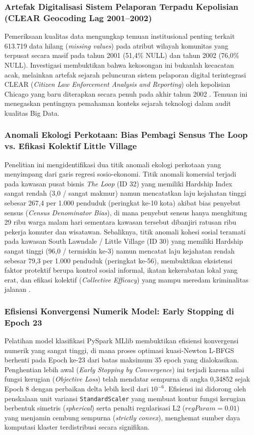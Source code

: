 \documentclass[11pt,a4paper]{article}
\begin{document}
\subsubsection{Artefak Digitalisasi Sistem Pelaporan Terpadu Kepolisian (CLEAR Geocoding Lag 2001--2002)}
Pemeriksaan kualitas data mengungkap temuan institusional penting terkait 613.719 data hilang (\textit{missing values}) pada atribut wilayah komunitas yang terpusat secara masif pada tahun 2001 (51,4\% NULL) dan tahun 2002 (76,0\% NULL). Investigasi membuktikan bahwa kekosongan ini bukanlah kecacatan acak, melainkan artefak sejarah peluncuran sistem pelaporan digital terintegrasi CLEAR (\textit{Citizen Law Enforcement Analysis and Reporting}) oleh kepolisian Chicago yang baru diterapkan secara penuh pada akhir tahun 2002 \cite{skogan2016}. Temuan ini menegaskan pentingnya pemahaman konteks sejarah teknologi dalam audit kualitas Big Data.

\subsubsection{Anomali Ekologi Perkotaan: Bias Pembagi Sensus The Loop vs. Efikasi Kolektif Little Village}
Penelitian ini mengidentifikasi dua titik anomali ekologi perkotaan yang menyimpang dari garis regresi sosio-ekonomi. Titik anomali komersial terjadi pada kawasan pusat bisnis \textit{The Loop} (ID 32) yang memiliki Hardship Index sangat rendah (3,0 / sangat makmur) namun mencatatkan laju kejahatan tinggi sebesar 267,4 per 1.000 penduduk (peringkat ke-10 kota) akibat bias penyebut sensus (\textit{Census Denominator Bias}), di mana penyebut sensus hanya menghitung 29 ribu warga malam hari sementara kawasan tersebut dibanjiri ratusan ribu pekerja komuter dan wisatawan. Sebaliknya, titik anomali kohesi sosial teramati pada kawasan South Lawndale / Little Village (ID 30) yang memiliki Hardship sangat tinggi (96,0 / termiskin ke-3) namun mencatat laju kejahatan rendah sebesar 79,3 per 1.000 penduduk (peringkat ke-56), membuktikan eksistensi faktor protektif berupa kontrol sosial informal, ikatan kekerabatan lokal yang erat, dan efikasi kolektif (\textit{Collective Efficacy}) yang mampu meredam kriminalitas jalanan \cite{campedelli2020}.

\subsubsection{Efisiensi Konvergensi Numerik Model: Early Stopping di Epoch 23}
Pelatihan model klasifikasi PySpark MLlib membuktikan efisiensi konvergensi numerik yang sangat tinggi, di mana proses optimasi kuasi-Newton L-BFGS berhenti pada Epoch ke-23 dari batas maksimum 35 epoch yang dialokasikan. Penghentian lebih awal (\textit{Early Stopping by Convergence}) ini terjadi karena nilai fungsi kerugian (\textit{Objective Loss}) telah mendatar sempurna di angka 0,34852 sejak Epoch 8 dengan perbaikan delta lebih kecil dari $10^{-6}$. Efisiensi ini didorong oleh penskalaan unit variansi \texttt{StandardScaler} yang membuat kontur fungsi kerugian berbentuk simetris (\textit{spherical}) serta penalti regularisasi L2 ($regParam=0.01$) yang menjamin cembung sempurna (\textit{strictly convex}), menghemat sumber daya komputasi klaster terdistribusi secara signifikan.
\end{document}
